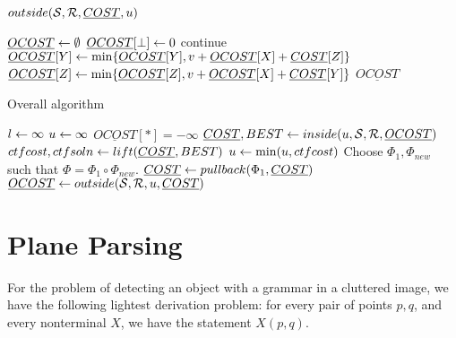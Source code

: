 \begin{algorithm}
\caption{$outside({\mathcal S},{\mathcal R},\underline{COST},u)$}
\begin{algorithmic}
  \STATE $\underline{OCOST} \leftarrow \emptyset$
  \STATE $\underline{OCOST}[\perp] \leftarrow 0$
  \STATE continue
  \ENDIF
  \STATE $\underline{OCOST}[Y] \leftarrow \min \{ \underline{OCOST}[Y], v + \underline{OCOST}[X] + \underline{COST}[Z]\}$
  \STATE $\underline{OCOST}[Z] \leftarrow \min \{ \underline{OCOST}[Z], v + \underline{OCOST}[X] + \underline{COST}[Y]\}$
  \ENDFOR
  \ENDFOR
  \RETURN $\underline{OCOST}$
\end{algorithmic}
\label{alg-filt-outside}
\end{algorithm}

\begin{algorithm}
\caption{Overall algorithm}
\begin{algorithmic}
  \STATE $l \leftarrow \infty$
  \STATE $u \leftarrow \infty$
  \STATE $\underline{OCOST}[*] = - \infty$
  \STATE $\underline{COST},BEST \leftarrow inside(u, {\mathcal S}, {\mathcal R}, \underline{OCOST})$
  \STATE $ctfcost, ctfsoln \leftarrow lift(\underline{COST},BEST)$
  \STATE $u \leftarrow \min(u, ctfcost)$
  \STATE Choose $\Phi_1, \Phi_{new}$ such that $\Phi = \Phi_1 \circ \Phi_{new}$.
  \STATE $\underline{COST} \leftarrow pullback(\Phi_1,\underline{COST})$
  \STATE $\underline{OCOST} \leftarrow outside({\mathcal S},{\mathcal R},u, \underline{COST})$
  \ENDWHILE
\end{algorithmic}
\label{alg-filt}
\end{algorithm}

\section{Plane Parsing}

For the problem of detecting an object with a grammar in a cluttered
image, we have the following lightest derivation problem: for every
pair of points $p,q$, and every nonterminal $X$, we have the statement
$X(p,q)$. 

